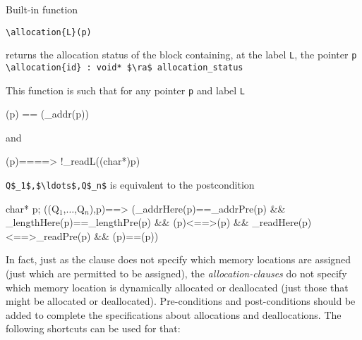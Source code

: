 Built-in function
\begin{notimplementedenv}\lstinline|\allocation{L}(p)|\end{notimplementedenv}%
returns the allocation status of the block containing, at the label 
\lstinline|L|, the pointer \lstinline|p| 
\\ \makebox[5mm]{} \lstinline|\allocation{id} : void* $\ra$ allocation_status|

This function is such that for any pointer \lstinline|p| and label \lstinline|L|
\begin{listing-nonumber}
(p) == (\base_addr(p))
\end{listing-nonumber}
and
\begin{listing-nonumber}
(p)==\unallocated ==> !\valid_read{L}((char*)p)
\end{listing-nonumber}

\allocates \lstinline|Q$_1$,$\ldots$,Q$_n$| is equivalent to the postcondition
\begin{listing-nonumber}
\forall char* p; 
\separated(\union(Q$_1$,$\ldots$,Q$_n$),p)==>
     (\base_addr{Here}(p)==\base_addr{Pre}(p)
      && \block_length{Here}(p)==\block_length{Pre}(p)
      && (p)<==>(p)
      && \valid_read{Here}(p)<==>\valid_read{Pre}(p)
      && (p)==(p))
\end{listing-nonumber}

In fact, just as the \assigns clause does not specify which memory locations are
assigned (just which are permitted to be assigned),
the \textsl{allocation-clauses} do not specify which memory location 
is dynamically allocated or deallocated (just those that might be allocated or deallocated).
Pre-conditions and post-conditions should be added to complete the specifications
about allocations and deallocations.
The following shortcuts can be used for that:

